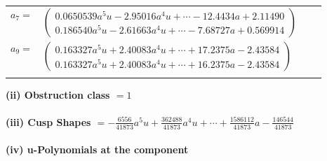 \documentclass[1p]{elsarticle_modified}
\theoremstyle{definition}
\begin{document}
\begin{tabular}{m{7pt} m{180pt} m{7pt} m{180pt} }
\flushright $a_{7}=$&$\begin{pmatrix}0.0650539 a^{5} u-2.95016 a^{4} u+\cdots-12.4434 a+2.11490\\0.186540 a^{5} u-2.61663 a^{4} u+\cdots-7.68727 a+0.569914\end{pmatrix}$ \\
\flushright $a_{9}=$&$\begin{pmatrix}0.163327 a^{5} u+2.40083 a^{4} u+\cdots+17.2375 a-2.43584\\0.163327 a^{5} u+2.40083 a^{4} u+\cdots+16.2375 a-2.43584\end{pmatrix}$\\&\end{tabular}
\flushleft \textbf{(ii) Obstruction class $= 1$}\\~\\
\flushleft \textbf{(iii) Cusp Shapes $= -\frac{6556}{41873} a^5 u+\frac{362488}{41873} a^4 u+\cdots+\frac{1586112}{41873} a-\frac{146544}{41873}$}\\~\\
\newpage\renewcommand{\arraystretch}{1}
\flushleft \textbf{(iv) u-Polynomials at the component}\newline \\
\end{document}
